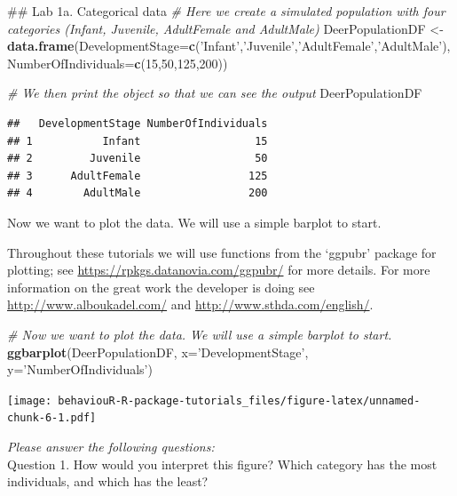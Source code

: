 \documentclass[]{book}
\newenvironment{Shaded}{\begin{snugshade}}{\end{snugshade}}
\newcommand{\CommentTok}[1]{\textcolor[rgb]{0.56,0.35,0.01}{\textit{#1}}}
\newcommand{\DataTypeTok}[1]{\textcolor[rgb]{0.13,0.29,0.53}{#1}}
\newcommand{\DecValTok}[1]{\textcolor[rgb]{0.00,0.00,0.81}{#1}}
\newcommand{\KeywordTok}[1]{\textcolor[rgb]{0.13,0.29,0.53}{\textbf{#1}}}
\newcommand{\NormalTok}[1]{#1}
\newcommand{\StringTok}[1]{\textcolor[rgb]{0.31,0.60,0.02}{#1}}
\begin{document}
\begin{Shaded}
\begin{Highlighting}[]
\NormalTok{## Lab 1a. Categorical data}
\CommentTok{# Here we create a simulated population with four categories (Infant, Juvenile, AdultFemale and AdultMale)}
\NormalTok{DeerPopulationDF <-}\StringTok{ }\KeywordTok{data.frame}\NormalTok{(}\DataTypeTok{DevelopmentStage=}\KeywordTok{c}\NormalTok{(}\StringTok{'Infant'}\NormalTok{,}\StringTok{'Juvenile'}\NormalTok{,}\StringTok{'AdultFemale'}\NormalTok{,}\StringTok{'AdultMale'}\NormalTok{),}
                         \DataTypeTok{NumberOfIndividuals=}\KeywordTok{c}\NormalTok{(}\DecValTok{15}\NormalTok{,}\DecValTok{50}\NormalTok{,}\DecValTok{125}\NormalTok{,}\DecValTok{200}\NormalTok{))}

\CommentTok{# We then print the object so that we can see the output}
\NormalTok{DeerPopulationDF}
\end{Highlighting}
\end{Shaded}

\begin{verbatim}
##   DevelopmentStage NumberOfIndividuals
## 1           Infant                  15
## 2         Juvenile                  50
## 3      AdultFemale                 125
## 4        AdultMale                 200
\end{verbatim}

Now we want to plot the data. We will use a simple barplot to start.

Throughout these tutorials we will use functions from the `ggpubr' package for plotting; see \url{https://rpkgs.datanovia.com/ggpubr/} for more details. For more information on the great work the developer is doing see \url{http://www.alboukadel.com/} and \url{http://www.sthda.com/english/}.

\begin{Shaded}
\begin{Highlighting}[]
\CommentTok{# Now we want to plot the data. We will use a simple barplot to start.}
\KeywordTok{ggbarplot}\NormalTok{(DeerPopulationDF, }\DataTypeTok{x=}\StringTok{'DevelopmentStage'}\NormalTok{, }\DataTypeTok{y=}\StringTok{'NumberOfIndividuals'}\NormalTok{)}
\end{Highlighting}
\end{Shaded}

\texttt{[image: behaviouR-R-package-tutorials\_files/figure-latex/unnamed-chunk-6-1.pdf]}

\emph{Please answer the following questions:}\\
Question 1. How would you interpret this figure? Which category has the most individuals, and which has the least?
\end{document}
